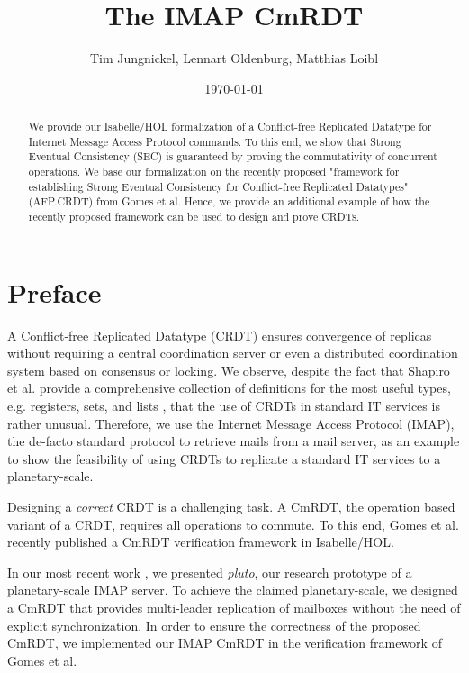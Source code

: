 \documentclass[11pt,a4paper, DIV=11]{article}
\begin{document}
\title{The IMAP CmRDT}
\author{Tim Jungnickel, Lennart Oldenburg, Matthias Loibl}
\date{\today}
\maketitle

\begin{abstract}
We provide our Isabelle/HOL formalization of a Conflict-free Replicated Datatype
for Internet Message Access Protocol commands. To this end, we show that Strong Eventual Consistency (SEC)
is guaranteed by proving the commutativity of concurrent operations. We base
our formalization on the recently proposed "framework for establishing Strong Eventual Consistency for Conflict-free Replicated Datatypes" (AFP.CRDT)
from Gomes et al{.} Hence, we provide an additional example of how the recently
proposed framework can be used to design and prove CRDTs.
\end{abstract}

\tableofcontents

\section{Preface}

A Conflict-free Replicated Datatype (CRDT) \cite{shapiro_crdt} ensures
convergence of replicas without requiring a central coordination server or even
a distributed coordination system based on consensus or locking.
We observe, despite the fact that Shapiro et al{.} provide a comprehensive
collection of definitions for the most useful types, e.g. registers, sets, and
lists \cite{shapiro_report}, that the use of CRDTs in standard IT services is rather unusual.
Therefore, we use the Internet Message Access Protocol (IMAP), the de-facto
standard protocol to retrieve mails from a mail server, as an example to show
the feasibility of using CRDTs to replicate a standard IT services to a
planetary-scale.

Designing a \emph{correct} CRDT is a challenging task.
A CmRDT, the operation based variant of a CRDT, requires all operations to
commute.
To this end, Gomes et al{.} recently published a CmRDT verification
framework \cite{gomes_crdtafp} in Isabelle/HOL.

In our most recent work \cite{pluto}, we presented \emph{pluto}, our research
prototype of a planetary-scale IMAP server.
To achieve the claimed planetary-scale, we designed a CmRDT that provides
multi-leader replication of mailboxes without the need of explicit
synchronization. In order to ensure the correctness of the proposed CmRDT, we
implemented our IMAP CmRDT in the verification framework of Gomes et al{.}
\end{document}
